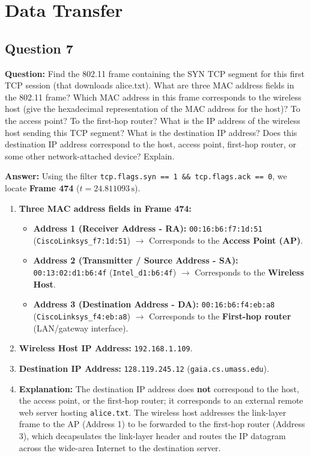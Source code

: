 \documentclass[oneside,final]{hcmut-report}
\begin{document}
\newpage
\section{Data Transfer}

\subsection{Question 7}
\textbf{Question:} Find the 802.11 frame containing the SYN TCP segment for this first TCP session (that downloads alice.txt). What are three MAC address fields in the 802.11 frame? Which MAC address in this frame corresponds to the wireless host (give the hexadecimal representation of the MAC address for the host)? To the access point? To the first-hop router? What is the IP address of the wireless host sending this TCP segment? What is the destination IP address? Does this destination IP address correspond to the host, access point, first-hop router, or some other network-attached device? Explain.

\textbf{Answer:}
Using the filter \texttt{tcp.flags.syn == 1 \&\& tcp.flags.ack == 0}, we locate \textbf{Frame 474} ($t = 24.811093\,\text{s}$).

\begin{enumerate}[noitemsep,label=\arabic*.]
    \item \textbf{Three MAC address fields in Frame 474:}
    \begin{itemize}[noitemsep]
        \item \textbf{Address 1 (Receiver Address - RA):} \texttt{00:16:b6:f7:1d:51} (\texttt{CiscoLinksys\_f7:1d:51}) $\rightarrow$ Corresponds to the \textbf{Access Point (AP)}.
        \item \textbf{Address 2 (Transmitter / Source Address - SA):} \texttt{00:13:02:d1:b6:4f} (\texttt{Intel\_d1:b6:4f}) $\rightarrow$ Corresponds to the \textbf{Wireless Host}.
        \item \textbf{Address 3 (Destination Address - DA):} \texttt{00:16:b6:f4:eb:a8} (\texttt{CiscoLinksys\_f4:eb:a8}) $\rightarrow$ Corresponds to the \textbf{First-hop router} (LAN/gateway interface).
    \end{itemize}
    \item \textbf{Wireless Host IP Address:} \texttt{192.168.1.109}.
    \item \textbf{Destination IP Address:} \texttt{128.119.245.12} (\texttt{gaia.cs.umass.edu}).
    \item \textbf{Explanation:} The destination IP address does \textbf{not} correspond to the host, the access point, or the first-hop router; it corresponds to an external remote web server hosting \texttt{alice.txt}. The wireless host addresses the link-layer frame to the AP (Address 1) to be forwarded to the first-hop router (Address 3), which decapsulates the link-layer header and routes the IP datagram across the wide-area Internet to the destination server.
\end{enumerate}
\end{document}
